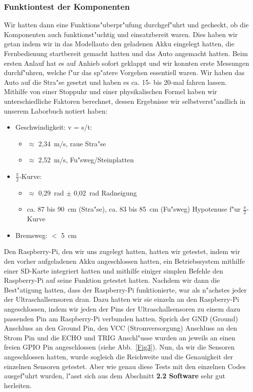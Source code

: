 \documentclass[a4paper,12pt]{article}
\newenvironment{smallitemize}{
	\begin{itemize}
		\setlength{\itemsep}{0pt}
		\setlength{\parskip}{0pt}
		\setlength{\parsep}{0pt}
}
{
	\end{itemize}
}
\begin{document}
\subsubsection{Funktiontest der Komponenten}\label{sec2.1.2}

Wir hatten dann eine Funktions"uberpr"ufung durchgef"uhrt und gecheckt, ob die Komponenten auch funktionst"uchtig und einsatzbereit waren.
Dies haben wir getan indem wir in das Modellauto den geladenen Akku eingelegt hatten, die Fernbedienung startbereit gemacht hatten und das Auto angemacht hatten.
Beim ersten Anlauf hat es auf Anhieb sofort geklappt und wir konnten erste Messungen durchf"uhren, welche f"ur das sp"atere Vorgehen essentiell waren.
Wir haben das Auto auf die Stra"se gesetzt und haben es ca. 15- bis 20-mal fahren lassen.
Mithilfe von einer Stoppuhr und einer physikalischen Formel haben wir unterschiedliche Faktoren berechnet, dessen Ergebnisse wir selbstverst"andlich in unserem Laborbuch notiert haben:

\begin{smallitemize}
	\item Geschwindigkeit: v = s/t:
	\begin{smallitemize}
		\item $ \approx $ 2,34~m/s, raue Stra"se
		\item $ \approx $ 2,52~m/s, Fu"sweg/Steinplatten
	\end{smallitemize}
	\item $ \frac{\pi}{2} $-Kurve:
	\begin{smallitemize}
		\item $ \approx $ 0,29~rad $ \pm $ 0,02~rad Radneigung
		\item ca. 87 bis 90~cm (Stra"se), ca. 83 bis 85~cm (Fu"sweg) Hypotenuse f"ur $ \frac{\pi}{2} $-Kurve
	\end{smallitemize}
	\item Bremsweg: $ < $ 5~cm
\end{smallitemize}

Den Raspberry-Pi, den wir uns zugelegt hatten, hatten wir getestet, indem wir den vorher aufgeladenen Akku angeschlossen hatten, ein Betriebssystem mithilfe einer SD-Karte integriert hatten und mithilfe einiger simplen Befehle den Raspberry-Pi auf seine Funktion getestet hatten. 
Nachdem wir dann die Best"atigung hatten, dass der Raspberry-Pi funktionierte, war als n"achstes jeder der Ultraschallsensoren dran.
Dazu hatten wir sie einzeln an den Raspberry-Pi angeschlossen, indem wir jeden der Pins der Ultraschallsensoren zu einem dazu passenden Pin am Raspberry-Pi verbunden hatten.
Sprich der GND (Ground) Anschluss an den Ground Pin, den VCC (Stromversorgung) Anschluss an den Strom Pin und die ECHO und TRIG Anschl"usse wurden an jeweils an einen freien GPIO Pin angeschlossen (siehe Abb.~\ref{Fig3}).
Nun, da wir die Sensoren angeschlossen hatten, wurde sogleich die Reichweite und die Genauigkeit der einzelnen Sensoren getestet.
Aber wie genau diese Tests mit den einzelnen Codes ausgef"uhrt wurden, l"asst sich aus dem Abschnitt {\bf 2.2 Software} sehr gut herleiten.
\end{document}
